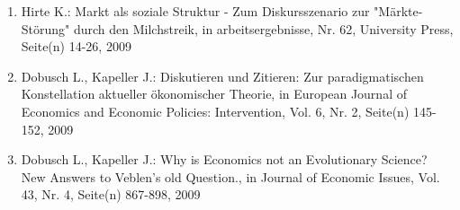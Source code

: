 \begin{enumerate}
	 \item Hirte K.: Markt als soziale Struktur - Zum Diskursszenario zur "Märkte-Störung" durch den Milchstreik, in arbeitsergebnisse, Nr. 62, University Press, Seite(n) 14-26, 2009
	 \item Dobusch L., Kapeller J.: Diskutieren und Zitieren: Zur paradigmatischen Konstellation aktueller ökonomischer Theorie, in European Journal of Economics and Economic Policies: Intervention, Vol. 6, Nr. 2, Seite(n) 145-152, 2009
	 \item Dobusch L., Kapeller J.: Why is Economics not an Evolutionary Science? New Answers to Veblen's old Question., in Journal of Economic Issues, Vol. 43, Nr. 4, Seite(n) 867-898, 2009
\end{enumerate}
